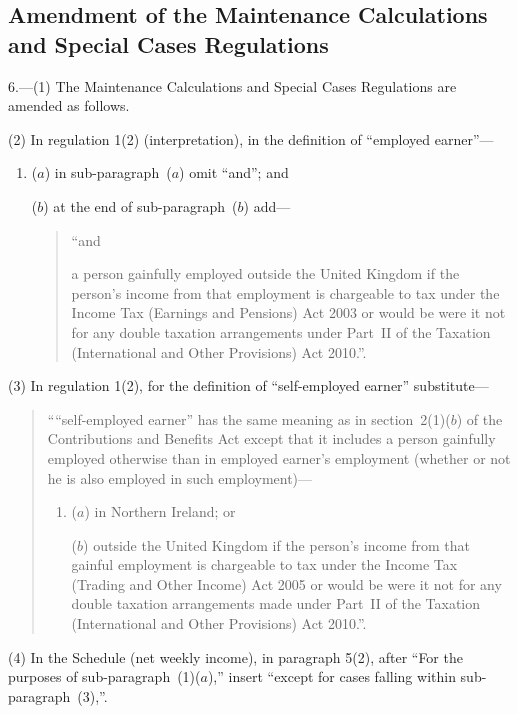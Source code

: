 \documentclass[12pt,a4paper]{article}
\begin{document}
\subsection[6. Amendment of the Maintenance Calculations and Special Cases Regulations]{Amendment of the Maintenance Calculations and Special Cases Regulations}

6.---(1)  The Maintenance Calculations and Special Cases Regulations are amended as follows.

(2) In regulation 1(2) (interpretation), in the definition of “employed earner”---
\begin{enumerate}\item[]
($a$) in sub-paragraph~($a$)  omit “and”; and

($b$) at the end of sub-paragraph~($b$)  add—
\begin{quotation}
“and

a person gainfully employed outside the United Kingdom if the person’s income from that employment is chargeable to tax under the Income Tax (Earnings and Pensions) Act 2003 or would be were it not for any double taxation arrangements under Part~II of the Taxation (International and Other Provisions) Act 2010.”.
\end{quotation}
\end{enumerate}

(3) In regulation 1(2), for the definition of “self-employed earner” substitute—
\begin{quotation}
\begin{sloppypar}
““self-employed earner” has the same meaning as in section~2(1)($b$)  of the Contributions and Benefits Act except that it includes a person gainfully employed otherwise than in employed earner’s employment (whether or not he is also employed in such employment)---
\end{sloppypar}
\begin{enumerate}\item[]
($a$) 
in Northern Ireland; or

($b$) 
outside the United Kingdom if the person’s income from that gainful employment is chargeable to tax under the Income Tax (Trading and Other Income) Act 2005 or would be were it not for any double taxation arrangements made under Part~II of the Taxation (International and Other Provisions) Act 2010.”.
\end{enumerate}
\end{quotation}

(4) In the Schedule (net weekly income), in paragraph 5(2), after “For the purposes of sub-paragraph~(1)($a$),” insert “except for cases falling within sub-paragraph~(3),”.
\end{document}
